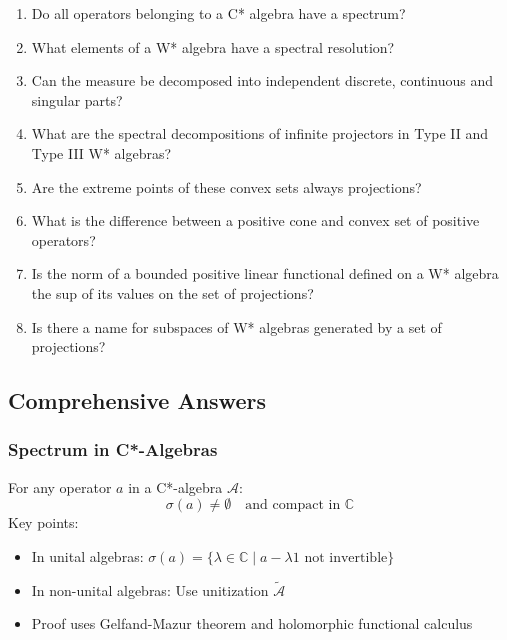 \documentclass{article}
\begin{document}
\begin{enumerate}
\item Do all operators belonging to a C* algebra have a spectrum?

\item What elements of a W* algebra have a spectral resolution?

\item Can the measure be decomposed into independent discrete, continuous
and singular parts?

\item What are the spectral decompositions of infinite projectors in Type II
and Type III W* algebras?

\item Are the extreme points of these convex sets always projections?

\item What is the difference between a positive cone and convex set of
positive operators?

\item Is the norm of a bounded positive linear functional defined on a W*
algebra the sup of its values on the set of projections?

\item Is there a name for subspaces of W* algebras generated by a set of
projections?
\end{enumerate}

\subsection*{Comprehensive Answers}

\subsubsection*{Spectrum in C*-Algebras}

For any operator $a $ in a C*-algebra $\mathcal{A} $: 
\begin{equation*}
\sigma(a) \neq \emptyset \quad \text{and compact in } \mathbb{C} 
\end{equation*}
Key points:

\begin{itemize}
\item In unital algebras: $\sigma(a) = \{\lambda \in \mathbb{C} \mid a -
\lambda 1 \text{ not invertible}\} $

\item In non-unital algebras: Use unitization $\widetilde{\mathcal{A}} $

\item Proof uses Gelfand-Mazur theorem and holomorphic functional calculus
\end{itemize}
\end{document}
